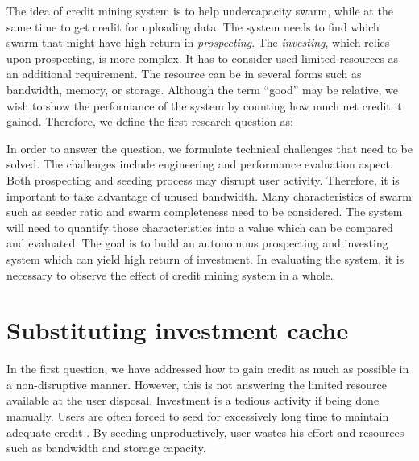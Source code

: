 The idea of credit mining system is to help undercapacity swarm, while at the same time to get credit for uploading data. The system needs to find which swarm that might have high return in \textit{prospecting}. The \textit{investing}, which relies upon prospecting, is more complex. It has to consider used-limited resources as an additional requirement. The resource can be in several forms such as bandwidth, memory, or storage. Although the term ``good'' may be relative, we wish to show the performance of the system by counting how much net credit it gained. Therefore, we define the first research question as:

	
In order to answer the question, we formulate technical challenges that need to be solved. The challenges include engineering and performance evaluation aspect. Both prospecting and seeding process may disrupt user activity. Therefore, it is important to take advantage of unused bandwidth. Many characteristics of swarm such as seeder ratio and swarm completeness need to be considered. The system will need to quantify those characteristics into a value which can be compared and evaluated. The goal is to build an autonomous prospecting and investing system which can yield high return of investment. In evaluating the system, it is necessary to observe the effect of credit mining system in a whole.

\section{Substituting investment cache}
In the first question, we have addressed how to gain credit as much as possible in a non-disruptive manner. However, this is not answering the limited resource available at the user disposal. Investment is a tedious activity if being done manually. Users are often forced to seed for excessively long time to maintain adequate credit \cite{2013:survivepriv:jia}. By seeding unproductively, user wastes his effort and resources such as bandwidth and storage capacity. 

